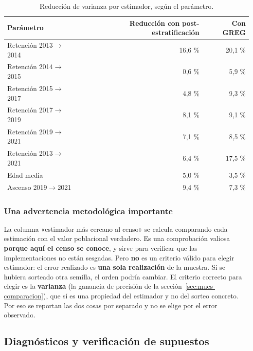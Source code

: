 \begin{table}[H]
  \centering
  \small
  \caption{Reducción de varianza por estimador, según el parámetro.}
  \label{tab:mues-ganancia}
  \begin{tabular}{@{}lrr@{}}
    \toprule
    \textbf{Parámetro} & \textbf{Reducción con post-estratificación}
      & \textbf{Con GREG} \\
    \midrule
    Retención 2013$\rightarrow$2014 & 16,6 \% & 20,1 \% \\
    Retención 2014$\rightarrow$2015 & 0,6 \% & 5,9 \% \\
    Retención 2015$\rightarrow$2017 & 4,8 \% & 9,3 \% \\
    Retención 2017$\rightarrow$2019 & 8,1 \% & 9,1 \% \\
    Retención 2019$\rightarrow$2021 & 7,1 \% & 8,5 \% \\
    Retención 2013$\rightarrow$2021 & 6,4 \% & 17,5 \% \\
    Edad media & 5,0 \% & 3,5 \% \\
    Ascenso 2019$\rightarrow$2021 & 9,4 \% & 7,3 \% \\
    \bottomrule
  \end{tabular}
\end{table}

\subsubsection{Una advertencia metodológica importante}

La columna «estimador más cercano al censo» se calcula comparando cada estimación
con el valor poblacional verdadero. Es una comprobación valiosa \textbf{porque
aquí el censo se conoce}, y sirve para verificar que las implementaciones no
están sesgadas. Pero \textbf{no} es un criterio válido para elegir estimador: el
error realizado es \textbf{una sola realización} de la muestra. Si se hubiera
sorteado otra semilla, el orden podría cambiar. El criterio correcto para elegir
es la \textbf{varianza} (la ganancia de precisión de la
sección~\ref{sec:mues-comparacion}), que sí es una propiedad del estimador y no
del sorteo concreto. Por eso se reportan las dos cosas por separado y no se
elige por el error observado.

\subsection{Diagnósticos y verificación de supuestos}
\label{sec:mues-diagnosticos}

